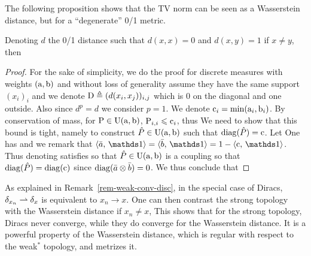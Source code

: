 The following proposition shows that the TV norm can be seen as a Wasserstein distance, but for a ``degenerate'' 0/1 metric.

\begin{prop}\label{prop-rel-wass-tv}
	Denoting $d$ the 0/1 distance such that $d(x,x)=0$ and $d(x,y)=1$ if $x \neq y$, then 
\end{prop}
\begin{proof}
	For the sake of simplicity, we do the proof for discrete measures with weights $(\a,\b)$ and without loss of generality assume they have the same support $(x_i)_i$ and we denote $\D \triangleq (d(x_i,x_j))_{i,j}$ which is 0 on the diagonal and one outside. 
	Also since $d^p=d$ we consider $p=1$. 
	We denote $\text{c}_i = \min(\a_i,\b_i)$.
	By conservation of mass, for $\P \in \CouplingsD(\a,\b)$, $\P_{i,i} \leq \text{c}_i$, thus
	We need to show that this bound is tight, namely to construct $\hat P \in \CouplingsD(\a,\b)$ such that 
	$\diag(\hat P)=\text{c}$. Let 
	One has 
	and we remark that $\dotp{\bar a}{\ones} = \dotp{\bar b}{\ones} = 1-\dotp{\text{c}}{\ones}$.
	Thus denoting 
	satisfies 
	so that $\hat P \in \CouplingsD(\a,\b)$  is a coupling so that $\diag(\hat P) = \diag(\text{c})$ since $\diag( \bar a \otimes \bar b )=0$. We thus conclude that
\end{proof}




As explained in Remark~\ref{rem-weak-conv-disc}, in the special case of Diracs, $\de_{x_n} \rightharpoonup \de_x$  is equivalent to $x_n \rightarrow x$. One can then contrast the strong topology with the Wasserstein distance if $x_n \neq x$, 
This shows that for the strong topology, Diracs never converge, while they do converge for the Wasserstein distance. It is a powerful property of the Wasserstein distance, which is regular with respect to the weak$^*$ topology, and metrizes it.

